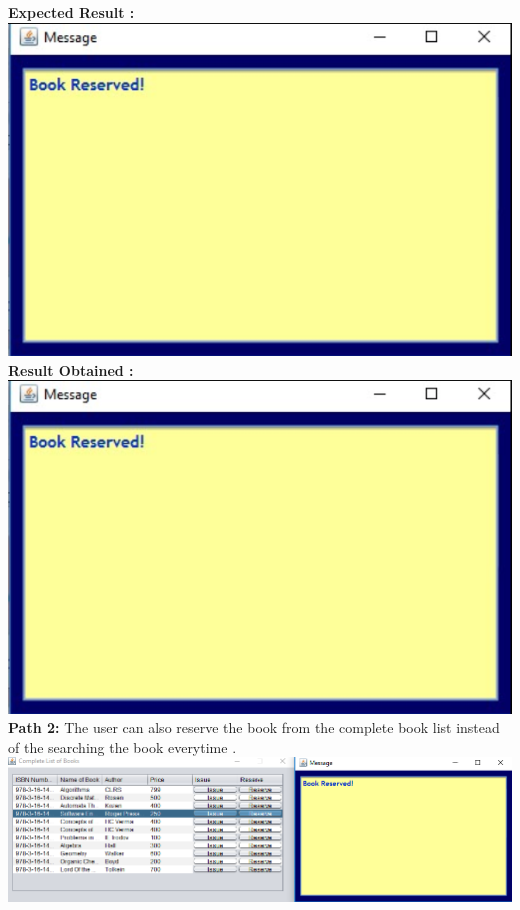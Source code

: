 \documentclass{article}
\begin{document}
\begin{enumerate}
\begin{itemize}
\textbf{Expected Result :}\\
\includegraphics[scale=0.8]{images/BookReserved.PNG}\\
\textbf{Result Obtained :}\\
\includegraphics[scale=0.8]{images/BookReserved.PNG}\\

\textbf{Path 2:}
The user can also reserve the book from the complete book list instead of the searching the book everytime . \\
\includegraphics[scale = 0.5]{images/UserLogin/Actions/Reserve_reserveNotif/BookReserved.PNG}\\



\end{itemize}
\end{enumerate}
\end{document}
